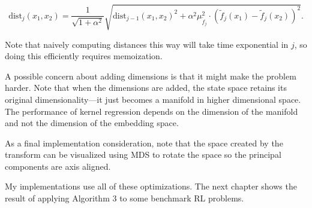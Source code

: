 $$\mathrm{dist}_j(x_1, x_2) = \frac{1}{\sqrt{1 + \alpha^2}}
\sqrt{\mathrm{dist}_{j-1}(x_1, x_2)^2 + \alpha^2\mu_{\tilde f_j}^2
\cdot(\tilde f_j(x_1) - \tilde f_j(x_2))^2}.$$

Note that naively computing distances this way will take time exponential
in $j$, so doing this efficiently requires memoization.

A possible concern about adding dimensions is that it might make the
problem harder. Note that when the dimensions are added, the state space
retains its original dimensionality---it just becomes a manifold
in higher dimensional space.
The performance of kernel regression depends on the dimension of the manifold
and not the dimension of the embedding space.

As a final implementation consideration, note that the space created by the
transform can be visualized using MDS to rotate
the space so the principal components are axis aligned.

My implementations use all of these optimizations. The next chapter shows
the result of applying Algorithm 3 to some benchmark RL problems.
